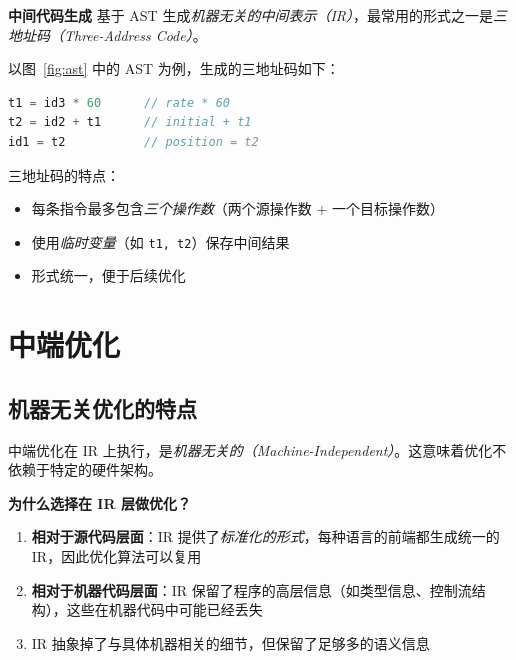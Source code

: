 \documentclass[12pt,a4paper]{ctexart}
\newcommand{\term}[1]{\textbf{\textcolor{mainblue}{#1}}}
\begin{document}
\begin{keybox}
  \term{中间代码生成} 基于 AST 生成\emph{机器无关的中间表示（IR）}，最常用的形式之一是\emph{三地址码（Three-Address Code）}。
\end{keybox}

以图~\ref{fig:ast} 中的 AST 为例，生成的三地址码如下：

\begin{lstlisting}[language=C, caption={三地址码示例}]
t1 = id3 * 60      // rate * 60
t2 = id2 + t1      // initial + t1
id1 = t2           // position = t2
\end{lstlisting}

三地址码的特点：
\begin{itemize}
  \item 每条指令最多包含\emph{三个操作数}（两个源操作数 + 一个目标操作数）
  \item 使用\emph{临时变量}（如 \texttt{t1, t2}）保存中间结果
  \item 形式统一，便于后续优化
\end{itemize}

\newpage

\section{中端优化}

\subsection{机器无关优化的特点}

\begin{keybox}
  中端优化在 IR 上执行，是\emph{机器无关的（Machine-Independent）}。这意味着优化不依赖于特定的硬件架构。
\end{keybox}

\textbf{为什么选择在 IR 层做优化？}

\begin{enumerate}[itemsep=0.3em]
  \item \textbf{相对于源代码层面}：IR 提供了\emph{标准化的形式}，每种语言的前端都生成统一的 IR，因此优化算法可以复用
  \item \textbf{相对于机器代码层面}：IR 保留了程序的高层信息（如类型信息、控制流结构），这些在机器代码中可能已经丢失
  \item IR 抽象掉了与具体机器相关的细节，但保留了足够多的语义信息
\end{enumerate}
\end{document}
